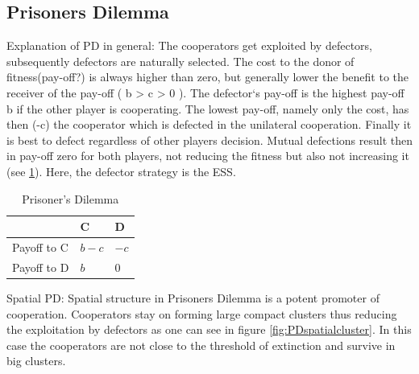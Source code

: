 \documentclass[DIV=calc, paper=a4, fontsize=11pt, twocolumn]{scrartcl}	 %
\begin{document}

\subsection*{Prisoners Dilemma}

Explanation of PD in general:
The cooperators get exploited by defectors, subsequently defectors are naturally selected. The cost to the donor of fitness(pay-off?) is always higher than zero, but generally lower the benefit to the receiver of the pay-off ( b > c > 0 ). The defector‘s pay-off is the highest pay-off b if the other player is cooperating. The lowest pay-off, namely only the cost, has then (-c) the cooperator which is defected in the unilateral cooperation. Finally it is best to defect regardless of other players decision. Mutual defections result then in pay-off zero for both players, not reducing the fitness but also not increasing it (see \ref{table1}). Here, the defector strategy is the ESS. 

\begin{table}[h]
\caption{Prisoner's Dilemma}
\label{table1}
\centering
\begin{tabular}{lll}
 & C & D \\
\midrule
Payoff to C & $b-c$ & $-c$ \\
Payoff to D & $b$ & $0$ \\
\bottomrule
\end{tabular}
\end{table}

Spatial PD: 
Spatial structure in Prisoners Dilemma is a potent promoter of cooperation. Cooperators stay on forming large compact clusters thus reducing the exploitation by defectors as one can see in figure \ref{fig:PDspatialcluster}. In this case the cooperators are not close to the threshold of extinction and survive in big clusters. 
\end{document}
